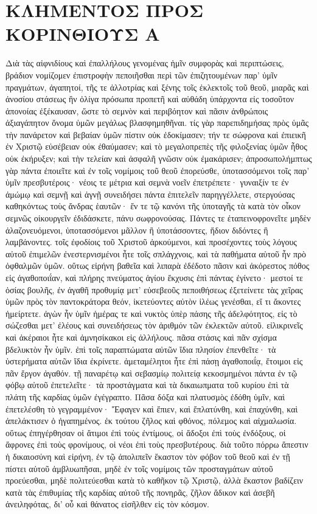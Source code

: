 \section{ΚΛΗΜΕΝΤΟΣ ΠΡΟΣ ΚΟΡΙΝΘΙΟΥΣ Α}
Διὰ τὰς αἰφνιδίους καὶ ἐπαλλήλους γενομένας ἡμῖν συμφορὰς καὶ περιπτώσεις, βράδιον νομίζομεν ἐπιστροφὴν πεποιῆσθαι περὶ τῶν ἐπιζητουμένων παρ’ ὑμῖν πραγμάτων, ἀγαπητοί, τῆς τε ἀλλοτρίας καὶ ξένης τοῖς ἐκλεκτοῖς τοῦ θεοῦ, μιαρᾶς καὶ ἀνοσίου στάσεως ἣν ὀλίγα πρόσωπα προπετῆ καὶ αὐθάδη ὑπάρχοντα εἰς τοσοῦτον ἀπονοίας ἐξέκαυσαν, ὥστε τὸ σεμνὸν καὶ περιβόητον καὶ πᾶσιν ἀνθρώποις ἀξιαγάπητον ὄνομα ὑμῶν μεγάλως βλασφημηθῆναι. τίς γὰρ παρεπιδημήσας πρὸς ὑμᾶς τὴν πανάρετον καὶ βεβαίαν ὑμῶν πίστιν οὐκ ἐδοκίμασεν; τήν τε σώφρονα καὶ ἐπιεικῆ ἐν Χριστῷ εὐσέβειαν οὐκ ἐθαύμασεν; καὶ τὸ μεγαλοπρεπὲς τῆς φιλοξενίας ὑμῶν ἦθος οὐκ ἐκήρυξεν; καὶ τὴν τελείαν καὶ ἀσφαλῆ γνῶσιν οὐκ ἐμακάρισεν; ἀπροσωπολήμπτως γὰρ πάντα ἐποιεῖτε καὶ ἐν τοῖς νομίμοις τοῦ θεοῦ ἐπορεύσθε, ὑποτασσόμενοι τοῖς παρ’ ὑμῖν πρεσβυτέροις· νέοις τε μέτρια καὶ σεμνὰ νοεῖν ἐπετρέπετε· γυναιξίν τε ἐν ἀμώμῳ καὶ σεμνῇ καὶ ἁγνῇ συνειδήσει πάντα ἐπιτελεῖν παρηγγέλλετε, στεργούσας καθηκόντως τοὺς ἄνδρας ἑαυτῶν· ἔν τε τῷ κανόνι τῆς ὑποταγῆς τὰ κατὰ τὸν οἶκον σεμνῶς οἰκουργεῖν ἐδιδάσκετε, πάνυ σωφρονούσας.
Πάντες τε ἐταπεινοφρονεῖτε μηδὲν ἀλαζονευόμενοι, ὑποτασσόμενοι μᾶλλον ἢ ὑποτάσσοντες, ἥδιον διδόντες ἢ λαμβάνοντες. τοῖς ἐφοδίοις τοῦ Χριστοῦ ἀρκούμενοι, καὶ προσέχοντες τοὺς λόγους αὐτοῦ ἐπιμελῶν ἐνεστερνισμένοι ἦτε τοῖς σπλάγχνοις, καὶ τὰ παθήματα αὐτοῦ ἧν πρὸ ὀφθαλμῶν ὑμῶν. οὕτως εἰρήνη βαθεῖα καὶ λιπαρὰ ἐδέδοτο πᾶσιν καὶ ἀκόρεστος πόθος εἰς ἀγαθοποιΐαν, καὶ πλήρης πνεύματος ἁγίου ἔκχυσις ἐπὶ πάντας ἐγίνετο· μεστοί τε ὁσίας βουλῆς, ἐν ἀγαθῆ προθυμίᾳ μετ’ εὐσεβεοῦς πεποιθήσεως ἐξετείνετε τὰς χεῖρας ὑμῶν πρὸς τὸν παντοκράτορα θεόν, ἱκετεύοντες αὐτὸν ἱλέως γενέσθαι, εἴ τι ἄκοντες ἡμείρτετε. ἀγὼν ἦν ὑμῖν ἡμέρας τε καὶ νυκτὸς ὑπὲρ πάσης τῆς ἀδελφότητος, εἰς τὸ σώζεσθαι μετ’ ἐλέους καὶ συνειδήσεως τὸν ἀριθμόν τῶν ἐκλεκτῶν αὐτοῦ. εἰλικρινεῖς καὶ ἀκέραιοι ἦτε καὶ ἀμνησίκακοι εἰς ἀλλήλους. πᾶσα στάσις καὶ πᾶν σχίσμα βδελυκτὸν ἦν ὑμῖν. ἐπὶ τοῖς παραπτώματα αὐτῶν ἴδια πλησίον ἐπενθεῖτε· τὰ ὑστερήματα αὐτῶν ἴδια ἐκρίνετε. ἀμεταμέλητοι ἦτε ἐπὶ πάσῃ ἀγαθοποιΐᾳ, ἕτοιμοι εἰς πᾶν ἔργον ἀγαθόν. τῇ παναρέτῳ καὶ σεβασμίῳ πολιτείᾳ κεκοσμημένοι πάντα ἐν τῷ φόβῳ αὐτοῦ ἐπετελεῖτε· τὰ προστάγματα καὶ τὰ δικαιωπματα τοῦ κυρίου ἐπὶ τὰ πλάτη τῆς καρδίας ὑμῶν ἐγέγραπτο.
Πᾶσα δόξα καὶ πλατυσμὸς ἐδόθη ὑμῖν, καὶ ἐπετελέσθη τὸ γεγραμμένον· Ἔφαγεν καὶ ἔπιεν, καὶ ἔπλατύνθη, καὶ ἐπαχύνθη, καὶ ἀπελάκτισεν ὁ ἠγαπημένος. ἐκ τούτου ζῆλος καὶ φθόνος, πόλεμος καὶ αἰχμαλωσία. οὕτως ἐπηγέρθησαν οἱ ἄτιμοι ἐπὶ τοὺς ἐντίμους, οἱ ἄδοξοι ἐπὶ τοὺς ἐνδόξους, οἱ ἄφρονες ἐπὶ τοὺς φρονίμους, οἱ νέοι ἐπὶ τοὺς πρεσβυτέρους. διὰ τοῦτο πόρρω ἄπεστιν ἡ δικαιοσύνη καὶ εἰρήνη, ἐν τῷ ἀπολιπεῖν ἕκαστον τὸν φόβον τοῦ θεοῦ καὶ ἐν τῇ πίστει αὐτοῦ ἀμβλυωπῆσαι, μηδὲ ἐν τοῖς νομίμοις τῶν προσταγμάτων αὐτοῦ προεύεσθαι, μηδὲ πολιτεύεσθαι κατὰ τὸ καθῆκον τῷ Χριστῷ, ἀλλὰ ἕκαστον βαδίζειν κατὰ τὰς ἐπιθυμίας τῆς καρδίας αὐτοῦ τῆς πονηρᾶς, ζῆλον ἄδικον καὶ ἀσεβῆ ἀνειληφότας, δι’ οὗ καὶ θάνατος εἰσῆλθεν εἰς τὸν κόσμον.
